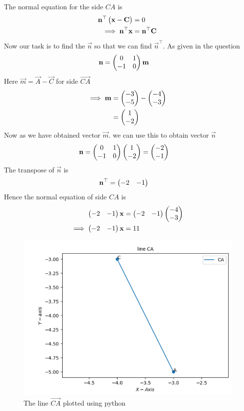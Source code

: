        The normal equation for the side $CA$ is
\begin{align}
\mathbf{n}^{\top}\begin{pmatrix}\mathbf{x}-\mathbf{C}\end{pmatrix}&=0\\
\implies
\mathbf{n}^{\top}\mathbf{x}&=\mathbf{n}^{\top}\mathbf{C}
\end{align}
Now our task is to find the $\vec{n}$ so that we can find $\vec{n}^{\top}$.
As given in the question 
\begin{align}
  \mathbf{n} &= \begin{pmatrix}0 & 1\\
  -1 & 0\end{pmatrix}\mathbf{m}
\end{align}
Here $\vec{m} = \vec{A}- \vec{C}$ for side $\vec{CA}$
\begin{align}
\implies
\mathbf{m}&=\begin{pmatrix}-3\\-5\end{pmatrix} - \begin{pmatrix}-4\\-3\end{pmatrix}\\
&=\begin{pmatrix}1\\-2\end{pmatrix}
\end{align}
Now as we have obtained vector $\vec{m}$.
we can use this to obtain vector $\vec{n}$
\begin{align}
\mathbf{n} &= \begin{pmatrix}0 & 1\\
  -1 & 0\end{pmatrix}\begin{pmatrix}1\\-2\end{pmatrix}
 = \begin{pmatrix}-2\\-1\end{pmatrix}
\end{align}
The transpose of $\vec{n}$ is
\begin{align}
  \mathbf{n}^{\top}&=\begin{pmatrix}-2 & -1\end{pmatrix}
\end{align}
Hence the normal equation of side $CA$ is 
\begin{align}
    \begin{pmatrix}-2 & -1\end{pmatrix}\mathbf{x}&=\begin{pmatrix}-2 & -1\end{pmatrix}\begin{pmatrix}-4\\-3\end{pmatrix}\\
    \implies
    \begin{pmatrix}-2 & -1\end{pmatrix}\mathbf{x}&=11
\end{align}
\begin{figure}
\includegraphics [width=\columnwidth] {figs/lineca.png}
\caption{ The line $\vec{CA}$ plotted using python}
\label{fig: lineca}
\end{figure}